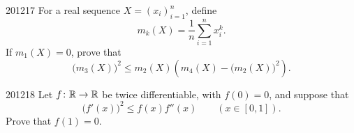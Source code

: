\begin{problem}{2012}{1}{7}
For a real sequence $X=(x_i)_{i=1}^n$, define
\[
    m_k(X)=\frac1n\sum_{i=1}^n x_i^k.
\]
If $m_1(X)=0$, prove that
\[
    \bigl(m_3(X)\bigr)^2
    \le
    m_2(X)\left(m_4(X)-\bigl(m_2(X)\bigr)^2\right).
\]
\end{problem}

\begin{problem}{2012}{1}{8}
Let $f\colon\mathbb{R}\to\mathbb{R}$ be twice differentiable, with $f(0)=0$, and suppose that
\[
    \bigl(f'(x)\bigr)^2\le f(x)f''(x)
    \qquad
    (x\in[0, 1]).
\]
Prove that $f(1)=0$.
\end{problem}
